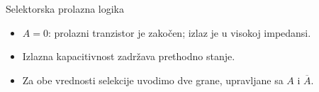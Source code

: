 \begin{frame}[label=09_3-s052]{Selektorska prolazna logika}
\begin{itemize}
\item $A=0$: prolazni tranzistor je zakočen; izlaz je u visokoj impedansi.
\item Izlazna kapacitivnost zadržava prethodno stanje.
\item Za obe vrednosti selekcije uvodimo dve grane, upravljane sa $A$ i $\overline A$.
\end{itemize}\begin{center}

\end{center}
\end{frame}
